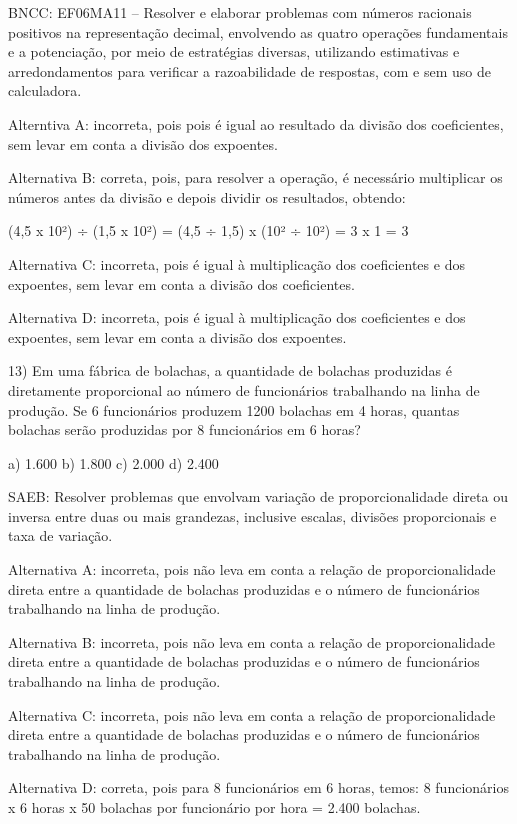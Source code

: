 BNCC: EF06MA11 -- Resolver e elaborar problemas com números racionais
positivos na representação decimal, envolvendo as quatro operações
fundamentais e a potenciação, por meio de estratégias diversas,
utilizando estimativas e arredondamentos para verificar a razoabilidade
de respostas, com e sem uso de calculadora.~

Alterntiva A: incorreta, pois pois é igual ao resultado da divisão dos
coeficientes, sem levar em conta a divisão dos expoentes.

Alternativa B: correta, pois, para resolver a operação, é necessário
multiplicar os números antes da divisão e depois dividir os resultados,
obtendo:

(4,5 x 10²) ÷ (1,5 x 10²) = (4,5 ÷ 1,5) x (10² ÷ 10²) = 3 x 1 = 3

Alternativa C: incorreta, pois é igual à multiplicação dos coeficientes
e dos expoentes, sem levar em conta a divisão dos coeficientes.

Alternativa D: incorreta, pois é igual à multiplicação dos coeficientes
e dos expoentes, sem levar em conta a divisão dos expoentes.

13) Em uma fábrica de bolachas, a quantidade de bolachas produzidas é
diretamente proporcional ao número de funcionários trabalhando na linha
de produção. Se 6 funcionários produzem 1200 bolachas em 4 horas,
quantas bolachas serão produzidas por 8 funcionários em 6 horas?

a) 1.600 b) 1.800 c) 2.000 d) 2.400

SAEB: Resolver problemas que envolvam variação de proporcionalidade
direta ou inversa entre duas ou mais grandezas, inclusive escalas,
divisões proporcionais e taxa de variação.

Alternativa A: incorreta, pois não leva em conta a relação de
proporcionalidade direta entre a quantidade de bolachas produzidas e o
número de funcionários trabalhando na linha de produção.

Alternativa B: incorreta, pois não leva em conta a relação de
proporcionalidade direta entre a quantidade de bolachas produzidas e o
número de funcionários trabalhando na linha de produção.

Alternativa C: incorreta, pois não leva em conta a relação de
proporcionalidade direta entre a quantidade de bolachas produzidas e o
número de funcionários trabalhando na linha de produção.

Alternativa D: correta, pois para 8 funcionários em 6 horas, temos: 8
funcionários x 6 horas x 50 bolachas por funcionário por hora = 2.400
bolachas.

